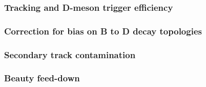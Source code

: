 \newpage
\subsubsection{Tracking and D-meson trigger efficiency}


\subsubsection{Correction for bias on B to D decay topologies}


\subsubsection{Secondary track contamination}


\subsubsection{Beauty feed-down}

